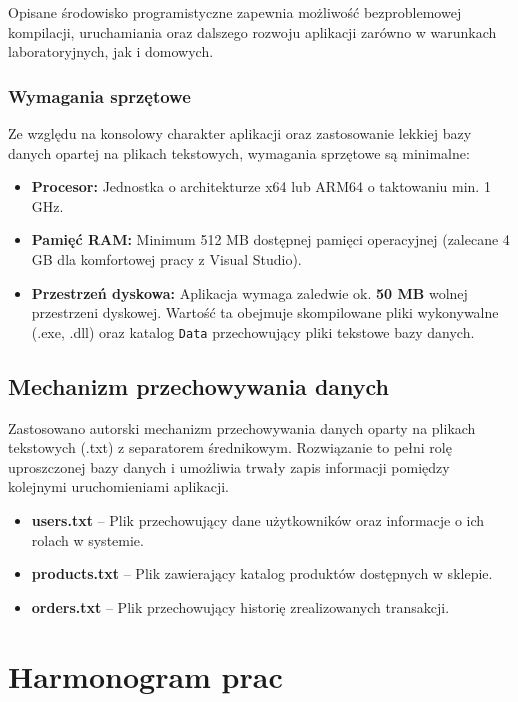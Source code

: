 \documentclass[a4paper,12pt]{report}
\begin{document}
Opisane środowisko programistyczne zapewnia możliwość bezproblemowej kompilacji, uruchamiania oraz dalszego rozwoju aplikacji zarówno w warunkach laboratoryjnych, jak i domowych.

\subsection{Wymagania sprzętowe}
Ze względu na konsolowy charakter aplikacji oraz zastosowanie lekkiej bazy danych opartej na plikach tekstowych, wymagania sprzętowe są minimalne:
\begin{itemize}
    \item \textbf{Procesor:} Jednostka o architekturze x64 lub ARM64 o taktowaniu min. 1 GHz.
    \item \textbf{Pamięć RAM:} Minimum 512 MB dostępnej pamięci operacyjnej (zalecane 4 GB dla komfortowej pracy z Visual Studio).
    \item \textbf{Przestrzeń dyskowa:} Aplikacja wymaga zaledwie ok. \textbf{50 MB} wolnej przestrzeni dyskowej. Wartość ta obejmuje skompilowane pliki wykonywalne (.exe, .dll) oraz katalog \texttt{Data} przechowujący pliki tekstowe bazy danych.
\end{itemize}

\section{Mechanizm przechowywania danych}
Zastosowano autorski mechanizm przechowywania danych oparty na plikach tekstowych (.txt) z separatorem średnikowym. Rozwiązanie to pełni rolę uproszczonej bazy danych i umożliwia trwały zapis informacji pomiędzy kolejnymi uruchomieniami aplikacji.

\begin{itemize}
    \item \textbf{users.txt} – Plik przechowujący dane użytkowników oraz informacje o ich rolach w systemie.
    \item \textbf{products.txt} – Plik zawierający katalog produktów dostępnych w sklepie.
    \item \textbf{orders.txt} – Plik przechowujący historię zrealizowanych transakcji.
\end{itemize}

\chapter{Harmonogram prac}
\end{document}

